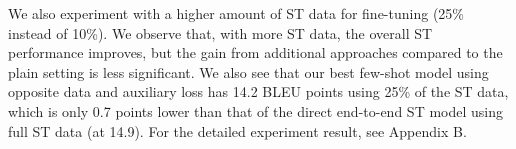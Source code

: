 \documentclass[conference]{IEEEtran}
\begin{document}
	
	We also experiment with a higher amount of ST data for fine-tuning (25\% instead of 10\%). We observe that, with more ST data, the overall ST performance improves, but the gain from additional approaches compared to the plain setting is less significant. We also see that our best few-shot model using opposite data and auxiliary loss has 14.2 BLEU points using 25\% of the ST data, which is only 0.7 points lower than that of the direct end-to-end ST model using full ST data (at 14.9). For the detailed experiment result, see Appendix B.
	
\end{document}
